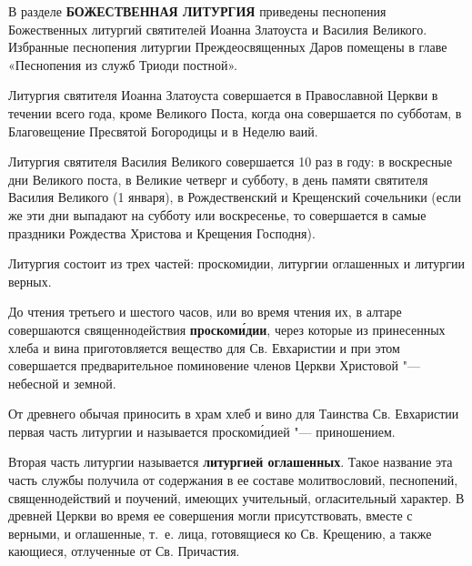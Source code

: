 

\label{_content_Liturgiya}


В разделе \textbf{БОЖЕСТВЕННАЯ ЛИТУРГИЯ} приведены песнопения Божественных литургий святителей Иоанна Златоуста и Василия Великого. Избранные песнопения литургии Преждеосвященных Даров помещены в главе «Песнопения из служб Триоди постной».

Литургия святителя Иоанна Златоуста совершается в Православной Церкви в течении всего года, кроме Великого Поста, когда она совершается по субботам, в Благовещение Пресвятой Богородицы и в Неделю ваий.

Литургия святителя Василия Великого совершается 10 раз в году: в воскресные дни Великого поста, в Великие четверг и субботу, в день памяти святителя Василия Великого (1 января), в Рождественский и Крещенский сочельники (если же эти дни выпадают на субботу или воскресенье, то совершается в самые праздники Рождества Христова и Крещения Господня).

Литургия состоит из трех частей: проскомидии, литургии оглашенных и литургии верных.


До чтения третьего и шестого часов, или во время чтения их, в алтаре совершаются священнодействия \textbf{проском\'{и}дии}, через которые из принесенных хлеба и вина приготовляется вещество для Св. Евхаристии и при этом совершается предварительное поминовение членов Церкви Христовой "--- небесной и земной.

От древнего обычая приносить в храм хлеб и вино для Таинства Св. Евхаристии первая часть литургии и называется проском\'{и}дией "--- приношением.

\mychapterending


Вторая часть литургии называется \textbf{литургией оглашенных}. Такое название эта часть службы получила от содержания в ее составе молитвословий, песнопений, священнодействий и поучений, имеющих учительный, огласительный характер. В древней Церкви во время ее совершения могли присутствовать, вместе с верными, и оглашенные, т.~е. лица, готовящиеся ко Св. Крещению, а также кающиеся, отлученные от Св. Причастия.

